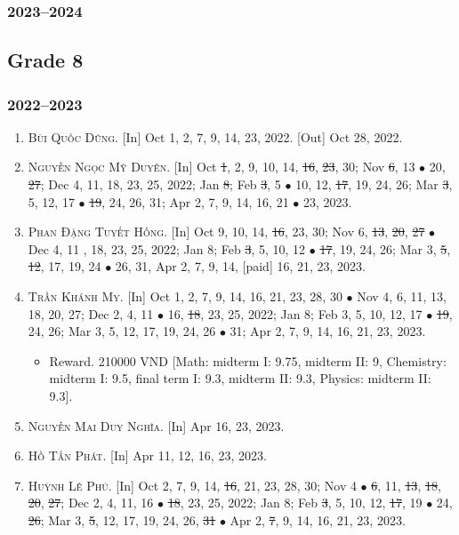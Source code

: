 \documentclass{article}
\begin{document}
\subsubsection{2023--2024}

\subsection{Grade 8}

\subsubsection{2022--2023}

\begin{enumerate}
	\item \textsc{Bùi Quốc Dũng.} \textsf{[In]} Oct 1, 2, 7, 9, 14, 23, 2022. \textsf{[Out]} Oct 28, 2022.
	\item \textsc{Nguyễn Ngọc Mỹ Duyên.} \textsf{[In]} Oct \st{1}, 2, 9, 10, 14, \st{16}, \st{23}, 30; Nov \st{6}, 13 $\bullet$ 20, \st{27}; Dec 4, 11, 18, 23, 25, 2022; Jan \st{8}; Feb \st{3}, 5 $\bullet$ 10, 12, \st{17}, 19, 24, 26; Mar \st{3}, 5, 12, 17 $\bullet$ \st{19}, 24, 26, 31; Apr 2, 7, 9, 14, 16, 21 $\bullet$ 23, 2023.
	\item \textsc{Phan Đặng Tuyết Hồng.} \textsf{[In]} Oct 9, 10, 14, \st{16}, 23, 30; Nov 6, \st{13}, \st{20}, \st{27} $\bullet$ Dec 4, 11 , 18, 23, 25, 2022; Jan 8; Feb \st{3}, 5, 10, 12 $\bullet$ \st{17}, 19, 24, 26; Mar 3, \st{5}, \st{12}, 17, 19, 24 $\bullet$ 26, 31, Apr 2, 7, 9, 14, [paid] 16, 21, 23, 2023.
	\item \textsc{Trần Khánh My.} \textsf{[In]} Oct 1, 2, 7, 9, 14, 16, 21, 23, 28, 30 $\bullet$ Nov 4, 6, 11, 13, 18, 20, 27; Dec 2, 4, 11 $\bullet$ 16, \st{18}, 23, 25, 2022; Jan 8; Feb 3, 5, 10, 12, 17 $\bullet$ \st{19}, 24, 26; Mar 3, 5, 12, 17, 19, 24, 26 $\bullet$ 31; Apr 2, 7, 9, 14, 16, 21, 23, 2023.
	\begin{itemize}
		\item \textsf{Reward.} 210000 VND [Math: midterm I: 9.75, midterm II: 9,  Chemistry: midterm I: 9.5, final term I: 9.3, midterm II: 9.3, Physics: midterm II: 9.3].
	\end{itemize}
	\item \textsc{Nguyễn Mai Duy Nghĩa.} \textsf{[In]} Apr 16, 23, 2023.
	\item \textsc{Hồ Tấn Phát.} \textsf{[In]} Apr 11, 12, 16, 23, 2023.
	\item \textsc{Huỳnh Lê Phú.} \textsf{[In]} Oct 2, 7, 9, 14, \st{16}, 21, 23, 28, 30; Nov 4 $\bullet$ \st{6}, 11, \st{13}, \st{18}, \st{20}, \st{27}; Dec 2, 4, 11, 16 $\bullet$ \st{18}, 23, 25, 2022; Jan 8; Feb \st{3}, 5, 10, 12, \st{17}, 19 $\bullet$ 24, \st{26}; Mar 3, \st{5}, 12, 17, 19, 24, 26, \st{31} $\bullet$ Apr 2, \st{7}, 9, 14, 16, 21, 23, 2023.

\end{enumerate}
\end{document}
